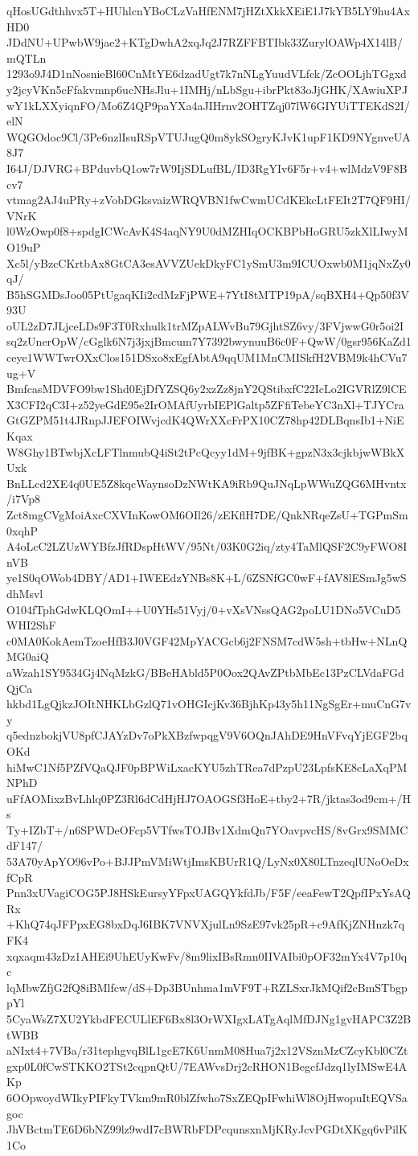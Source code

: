 qHosUGdthhvx5T+HUhlcnYBoCLzVaHfENM7jHZtXkkXEiE1J7kYB5LY9hu4AxHD0
JDdNU+UPwbW9jae2+KTgDwhA2xqJq2J7RZFFBTIbk33ZurylOAWp4X14lB/mQTLn
1293o9J4D1nNosnieBl60CnMtYE6dzadUgt7k7nNLgYuudVLfck/ZcOOLjhTGgxd
y2jcyVKn5cFfakvmnp6ucNHsJlu+1IMHj/nLbSgu+ibrPkt83oJjGHK/XAwiuXPJ
wY1kLXXyiqnFO/Mo6Z4QP9paYXa4aJIHrnv2OHTZqj07lW6GIYUiTTEKdS2I/elN
WQGOdoc9Cl/3Pe6nzlIsuRSpVTUJugQ0m8ykSOgryKJvK1upF1KD9NYgnveUA8J7
I64J/DJVRG+BPduvbQ1ow7rW9IjSDLufBL/ID3RgYIv6F5r+v4+wlMdzV9F8Bcv7
vtmag2AJ4uPRy+zVobDGksvaizWRQVBN1fwCwmUCdKEkcLtFEIt2T7QF9HI/VNrK
l0WzOwp0f8+spdgICWcAvK4S4aqNY9U0dMZHIqOCKBPbHoGRU5zkXlLIwyMO19uP
Xc5l/yBzcCKrtbAx8GtCA3esAVVZUekDkyFC1ySmU3m9ICUOxwb0M1jqNxZy0qJ/
B5hSGMDsJoo05PtUgaqKIi2cdMzFjPWE+7YtI8tMTP19pA/sqBXH4+Qp50f3V93U
oUL2zD7JLjceLDs9F3T0Rxhulk1trMZpALWvBu79GjhtSZ6vy/3FVjwwG0r5oi2I
sq2zUnerOpW/cGglk6N7j3jxjBmcum7Y7392bwynuuB6c0F+QwW/0gsr956KaZd1
ceye1WWTwrOXxClos151DSxo8xEgfAbtA9qqUM1MnCMISkfH2VBM9k4hCVu7ug+V
BmfcasMDVFO9bw1Shd0EjDfYZSQ6y2xzZz8jnY2QStibxfC22IcLo2IGVRlZ9lCE
X3CFI2qC3I+z52yeGdE95e2IrOMAfUyrbIEPlGaltp5ZFfiTebeYC3nXl+TJYCra
GtGZPM51t4JRnpJJEFOIWvjcdK4QWrXXcFrPX10CZ78hp42DLBqnsIb1+NiEKqax
W8Ghy1BTwbjXcLFTlnmubQ4iSt2tPcQcyy1dM+9jfBK+gpzN3x3cjkbjwWBkXUxk
BnLLcd2XE4q0UE5Z8kqcWaynsoDzNWtKA9iRb9QuJNqLpWWuZQG6MHvntx/i7Vp8
Zct8mgCVgMoiAxcCXVInKowOM6OIl26/zEKflH7DE/QnkNRqeZsU+TGPmSm0xqhP
A4oLcC2LZUzWYBfzJfRDspHtWV/95Nt/03K0G2iq/zty4TaMlQSF2C9yFWO8InVB
ye1S0qOWob4DBY/AD1+IWEEdzYNBs8K+L/6ZSNfGC0wF+fAV8lESmJg5wSdhMsvl
O104fTphGdwKLQOmI++U0YHs51Vyj/0+vXsVNssQAG2poLU1DNo5VCuD5WHI2ShF
c0MA0KokAemTzoeHfB3J0VGF42MpYACGcb6j2FNSM7cdW5sh+tbHw+NLnQMG0aiQ
aWzah1SY9534Gj4NqMzkG/BBeHAbld5P0Oox2QAvZPtbMbEc13PzCLVdaFGdQjCa
hkbd1LgQjkzJOItNHKLbGzlQ71vOHGIcjKv36BjhKp43y5h11NgSgEr+muCnG7vy
q5ednzbokjVU8pfCJAYzDv7oPkXBzfwpqgV9V6OQnJAhDE9HnVFvqYjEGF2bqOKd
hiMwC1Nf5PZfVQaQJF0pBPWiLxacKYU5zhTRea7dPzpU23LpfsKE8cLaXqPMNPhD
uFfAOMixzBvLhlq0PZ3Rl6dCdHjHJ7OAOGSf3HoE+tby2+7R/jktas3od9cm+/Hs
Ty+IZbT+/n6SPWDeOFcp5VTfwsTOJBv1XdmQn7YOavpvcHS/8vGrx9SMMCdF147/
53A70yApYO96vPo+BJJPmVMiWtjImsKBUrR1Q/LyNx0X80LTnzeqlUNoOeDxfCpR
Pnn3xUVagiCOG5PJ8HSkEursyYFpxUAGQYkfdJb/F5F/eeaFewT2QpfIPxYsAQRx
+KhQ74qJFPpxEG8bxDqJ6IBK7VNVXjulLn9SzE97vk25pR+c9AfKjZNHnzk7qFK4
xqxaqm43zDz1AHEi9UhEUyKwFv/8m9lixIBsRmn0IIVAIbi0pOF32mYx4V7p10qc
lqMbwZfjG2fQ8iBMlfcw/dS+Dp3BUnhma1mVF9T+RZLSxrJkMQif2cBmSTbgppYl
5CyaWsZ7XU2YkbdFECULlEF6Bx8l3OrWXIgxLATgAqlMfDJNg1gvHAPC3Z2BtWBB
aNIxt4+7VBa/r31tephgvqBlL1gcE7K6UnmM08Hua7j2x12VSznMzCZcyKbl0CZt
gxp0L0fCwSTKKO2TSt2cqpnQtU/7EAWvsDrj2cRHON1BegcfJdzq1lyIMSwE4AKp
6OOpwoydWIkyPIFkyTVkm9mR0blZfwho7SxZEQpIFwhiWl8OjHwopuItEQVSagoc
JhVBctmTE6D6bNZ99lz9wdI7cBWRbFDPcqunsxnMjKRyJcvPGDtXKgq6vPilK1Co
